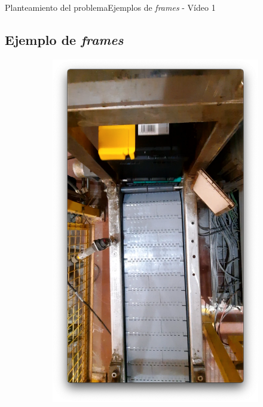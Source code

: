 \documentclass{beamer}
\begin{document}
\begin{frame}{Planteamiento del problema}{Ejemplos de \textit{frames} - Vídeo 1}
\subsection{Ejemplo de \textit{frames}}
\begin{figure}
\centering
    \begin{subfigure}[t]{0.4\textwidth}
        \includegraphics[width=\textwidth]{img/B1.png}
    \end{subfigure}
    \begin{subfigure}[b]{0.4\textwidth}

\end{subfigure}
\end{figure}
\end{frame}
\end{document}
